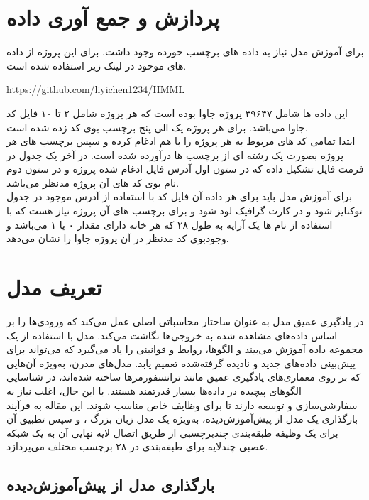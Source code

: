 \section{پردازش و جمع آوری داده}
برای آموزش مدل نیاز به داده های برچسب خورده وجود داشت. برای این پروژه از داده های موجود در لینک زیر استفاده شده است.
\begin{latin}
	\url{https://github.com/liyichen1234/HMML}
\end{latin}
این داده ها شامل ۳۹۶۴۷ پروژه جاوا بوده است که هر پروژه شامل ۲ تا ۱۰ فایل کد جاوا می‌باشد.
برای هر پروژه یک الی پنج برچسب بوی کد زده شده است.
\\
ابتدا تمامی کد های مربوط به هر پروژه را با هم ادغام کرده و سپس برچسب های هر پروژه بصورت یک رشته ای از برچسب ها درآورده شده است.
در آخر یک جدول در فرمت فایل  تشکیل داده که در ستون اول آدرس فایل ادغام شده پروژه و در ستون دوم نام بوی کد های آن پروژه مدنظر می‌باشد.
\\
برای آموزش مدل باید برای هر داده آن فایل کد با استفاده از آدرس موجود در جدول توکنایز شود و در کارت گرافیک لود شود و برای برچسب های آن پروژه نیاز هست که با استفاده از نام ها یک آرایه به طول ۲۸ که هر خانه دارای مقدار ۰ یا ۱ می‌باشد و وجودبوی کد مدنظر در آن پروژه جاوا را نشان می‌دهد.\cite{BOGATINOVSKI2022117215}
\section{تعریف مدل}
در یادگیری عمیق مدل به عنوان ساختار محاسباتی اصلی عمل می‌کند که ورودی‌ها را بر اساس داده‌های مشاهده شده به خروجی‌ها نگاشت می‌کند. مدل با استفاده از یک مجموعه داده آموزش می‌بیند و الگوها، روابط و قوانینی را یاد می‌گیرد که می‌تواند برای پیش‌بینی داده‌های جدید و نادیده گرفته‌شده تعمیم یابد. مدل‌های مدرن، به‌ویژه آن‌هایی که بر روی معماری‌های یادگیری عمیق مانند ترانسفورمرها ساخته شده‌اند، در شناسایی الگوهای پیچیده در داده‌ها بسیار قدرتمند هستند. با این حال، اغلب نیاز به سفارشی‌سازی و توسعه دارند تا برای وظایف خاص مناسب شوند. این مقاله به فرآیند بارگذاری یک مدل از پیش‌آموزش‌دیده، به‌ویژه یک مدل زبان بزرگ ، و سپس تطبیق آن برای یک وظیفه طبقه‌بندی چند‌برچسبی از طریق اتصال لایه نهایی آن به یک شبکه عصبی چندلایه  برای طبقه‌بندی در ۲۸ برچسب مختلف می‌پردازد.\cite{Zhang2022code}
\subsection{بارگذاری مدل از پیش‌آموزش‌دیده}

